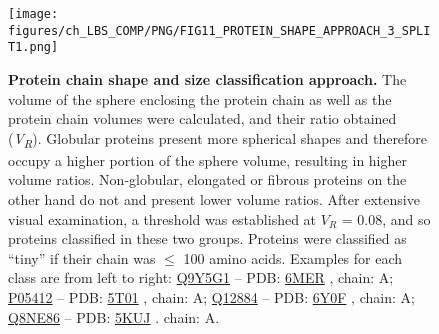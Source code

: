 \begin{figure}[htb!]
    \centering
    \texttt{[image: figures/ch\_LBS\_COMP/PNG/FIG11\_PROTEIN\_SHAPE\_APPROACH\_3\_SPLIT1.png]}
    \caption[Protein chain shape and size classification approach]{\textbf{Protein chain shape and size classification approach.} The volume of the sphere enclosing the protein chain as well as the protein chain volumes were calculated, and their ratio obtained (\textit{V\textsubscript{R}}). Globular proteins present more spherical shapes and therefore occupy a higher portion of the sphere volume, resulting in higher volume ratios. Non-globular, elongated or fibrous proteins on the other hand do not and present lower volume ratios. After extensive visual examination, a threshold was established at $V_R$ = 0.08, and so proteins classified in these two groups. Proteins were classified as ``tiny'' if their chain was $\leq$ 100 amino acids. Examples for each class are from left to right: \href{https://www.uniprot.org/uniprotkb/Q9Y5G1/entry}{Q9Y5G1} -- PDB: \href{https://www.ebi.ac.uk/pdbe/entry/pdb/6mer}{6MER} \cite{NICLOLUDIS_2019_CADH}, chain: A; \href{https://www.uniprot.org/uniprotkb/P05412/entry}{P05412} -- PDB: \href{https://www.ebi.ac.uk/pdbe/entry/pdb/5t01}{5T01} \cite{HONG_2017_EPSTEINBARR}, chain: A; \href{https://www.uniprot.org/uniprotkb/Q12884/entry}{Q12884} -- PDB: \href{https://www.ebi.ac.uk/pdbe/entry/pdb/6Y0F}{6Y0F} \cite{PDB_6Y0F}, chain: A; \href{https://www.uniprot.org/uniprotkb/Q8NE86/entry}{Q8NE86} -- PDB: \href{https://www.ebi.ac.uk/pdbe/entry/pdb/5KUJ}{5KUJ} \cite{LEE_2016_CALCIUM}. chain: A.}
    \label{fig:protein_class_approach}
\end{figure}

